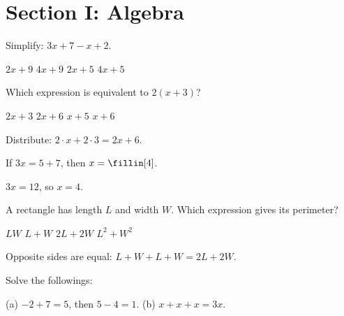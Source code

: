 
\section*{Section I: Algebra}

\question[5]
Simplify: $3x + 7 - x + 2$.
\begin{choices}
  \CorrectChoice $2x + 9$
  \choice $4x + 9$
  \choice $2x + 5$
  \choice $4x + 5$
\end{choices}

\question[5]
Which expression is equivalent to $2(x+3)$?
\begin{choices}
  \choice $2x+3$
  \CorrectChoice $2x+6$
  \choice $x+5$
  \choice $x+6$
\end{choices}
\begin{solution}
  Distribute: $2\cdot x + 2\cdot 3 = 2x+6$.
\end{solution}

\question[5]
If $3x = 5 + 7$, then $x = \fillin[4]$.
\begin{solution}
  $3x=12$, so $x=4$.
\end{solution}

\question[5]
A rectangle has length $L$ and width $W$. Which expression gives its perimeter?
\begin{choices}
  \choice $LW$
  \choice $L+W$
  \CorrectChoice $2L+2W$
  \choice $L^2+W^2$
\end{choices}
\begin{solution}
  Opposite sides are equal: $L+W+L+W=2L+2W$.
\end{solution}

\question[5]
Solve the followings:
\begin{solution}
  (a) $-2+7=5$, then $5-4=1$. \quad (b) $x+x+x=3x$.
\end{solution}

